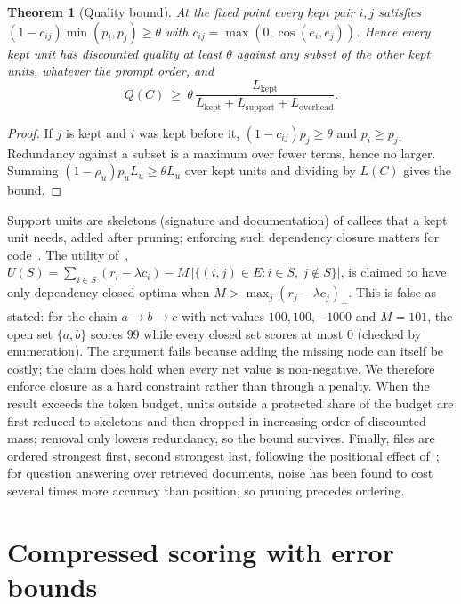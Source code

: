 \documentclass[10pt,twocolumn]{article}
\newtheorem{theorem}{Theorem}
\theoremstyle{definition}
\theoremstyle{remark}
\begin{document}
\begin{theorem}[Quality bound]\label{thm:rcq-bound}
At the fixed point every kept pair $i,j$ satisfies $(1-c_{ij})\min(p_i,p_j)\ge\theta$ with $c_{ij}=\max(0,\cos(e_i,e_j))$.
Hence every kept unit has discounted quality at least $\theta$ against \emph{any} subset of the other kept units, whatever the prompt order, and
\begin{equation}
Q(C)\ \ge\ \theta\,\frac{L_{\mathrm{kept}}}{L_{\mathrm{kept}}+L_{\mathrm{support}}+L_{\mathrm{overhead}}}.
\end{equation}
\end{theorem}
\begin{proof}
If $j$ is kept and $i$ was kept before it, $(1-c_{ij})p_j\ge\theta$ and $p_i\ge p_j$. Redundancy against a subset is a maximum over fewer terms, hence no larger. Summing $(1-\rho_u)p_uL_u\ge\theta L_u$ over kept units and dividing by $L(C)$ gives the bound.
\end{proof}
Support units are skeletons (signature and documentation) of callees that a kept unit needs, added after pruning; enforcing such dependency closure matters for code~\cite{wang2026lamr}.
The utility of~\cite{wang2026lamr}, $U(S)=\sum_{i\in S}(r_i-\lambda c_i)-M\,\bigl|\{(i,j)\in E: i\in S,\ j\notin S\}\bigr|$, is claimed to have only dependency-closed optima when $M>\max_j(r_j-\lambda c_j)_+$.
This is false as stated: for the chain $a\to b\to c$ with net values $100,100,-1000$ and $M=101$, the open set $\{a,b\}$ scores $99$ while every closed set scores at most $0$ (checked by enumeration).
The argument fails because adding the missing node can itself be costly; the claim does hold when every net value is non-negative.
We therefore enforce closure as a hard constraint rather than through a penalty.
When the result exceeds the token budget, units outside a protected share of the budget are first reduced to skeletons and then dropped in increasing order of discounted mass; removal only lowers redundancy, so the bound survives.
Finally, files are ordered strongest first, second strongest last, following the positional effect of~\cite{liu2024lost}; for question answering over retrieved documents, noise has been found to cost several times more accuracy than position, so pruning precedes ordering.

\section{Compressed scoring with error bounds}\label{sec:compress}
\end{document}
